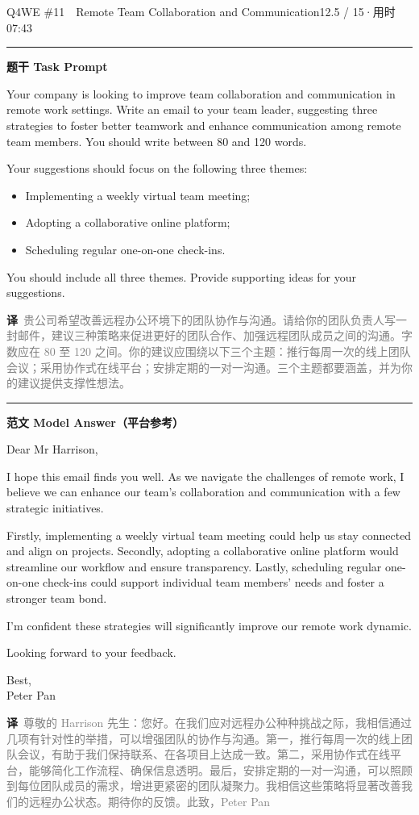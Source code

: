 \documentclass[11pt]{article}
\newcommand{\ptesub}[1]{%
  \par\needspace{2\baselineskip}\smallskip
  {\color{cAccent}\rule[-0.2ex]{3pt}{1.05em}}\hspace{6pt}%
  {\bfseries\color{cHead}#1}\par\nopagebreak\smallskip}
\newcommand{\zh}[1]{{\footnotesize\textcolor{cNote}{\textbf{译}}\ \textcolor{gray}{#1}}}
\begin{document}
\begin{qblock}{Q4\quad WE \#11\ \ Remote Team Collaboration and Communication}{12.5 / 15\quad·\quad 用时 07:43}

\ptesub{题干 Task Prompt}
\begin{promptbox}
Your company is looking to improve team collaboration and communication in remote work settings. Write an email to your team leader, suggesting three strategies to foster better teamwork and enhance communication among remote team members. You should write between 80 and 120 words.

\smallskip Your suggestions should focus on the following three themes:
\begin{itemize}[leftmargin=1.4em,topsep=2pt,itemsep=0pt]
  \item Implementing a weekly virtual team meeting;
  \item Adopting a collaborative online platform;
  \item Scheduling regular one-on-one check-ins.
\end{itemize}
You should include all three themes. Provide supporting ideas for your suggestions.
\end{promptbox}
\zh{贵公司希望改善远程办公环境下的团队协作与沟通。请给你的团队负责人写一封邮件，建议三种策略来促进更好的团队合作、加强远程团队成员之间的沟通。字数应在 80 至 120 之间。你的建议应围绕以下三个主题：推行每周一次的线上团队会议；采用协作式在线平台；安排定期的一对一沟通。三个主题都要涵盖，并为你的建议提供支撑性想法。}

\ptesub{范文 Model Answer（平台参考）}
\begin{modelbox}
Dear Mr Harrison,

I hope this email finds you well. As we navigate the challenges of remote work, I believe we can enhance our team's collaboration and communication with a few strategic initiatives.

Firstly, implementing a weekly virtual team meeting could help us stay connected and align on projects. Secondly, adopting a collaborative online platform would streamline our workflow and ensure transparency. Lastly, scheduling regular one-on-one check-ins could support individual team members' needs and foster a stronger team bond.

I'm confident these strategies will significantly improve our remote work dynamic.

Looking forward to your feedback.

Best,\\ Peter Pan
\end{modelbox}
\zh{尊敬的 Harrison 先生：您好。在我们应对远程办公种种挑战之际，我相信通过几项有针对性的举措，可以增强团队的协作与沟通。第一，推行每周一次的线上团队会议，有助于我们保持联系、在各项目上达成一致。第二，采用协作式在线平台，能够简化工作流程、确保信息透明。最后，安排定期的一对一沟通，可以照顾到每位团队成员的需求，增进更紧密的团队凝聚力。我相信这些策略将显著改善我们的远程办公状态。期待你的反馈。此致，Peter Pan}


\end{qblock}
\end{document}
